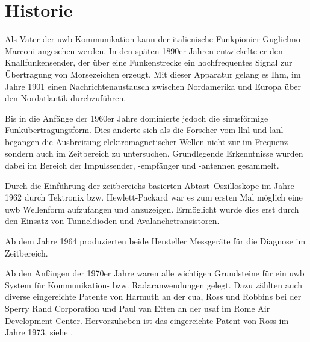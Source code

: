 \begin{comment}
------------------------------------------------------------------------------------------
\end{comment}
\section{Historie}

Als Vater der \gls{uwb} Kommunikation kann der italienische Funkpionier Guglielmo Marconi angesehen werden. In den späten 1890er Jahren entwickelte er den Knallfunkensender, der über eine Funkenstrecke ein hochfrequentes Signal zur Übertragung von Morsezeichen erzeugt. Mit dieser Apparatur gelang es Ihm, im Jahre 1901 einen Nachrichtenaustausch zwischen Nordamerika und Europa über den Nordatlantik durchzuführen.\cite{fontana2004recent}


Bis in die Anfänge der 1960er Jahre dominierte jedoch die sinusförmige Funkübertragungsform. Dies änderte sich als die Forscher vom \gls{llnl} und \gls{lanl} begangen die Ausbreitung elektromagnetischer Wellen nicht zur im Frequenz- sondern auch im Zeitbereich zu untersuchen. Grundlegende Erkenntnisse wurden dabei im Bereich der Impulssender, -empfänger und -antennen gesammelt.\cite{eltaher2004positioning, fontana2004recent, lakkundi2006ultra, aiello2006ultra}

Durch die Einführung der zeitbereichs basierten Abtast--Oszilloskope im Jahre 1962 durch Tektronix bzw. Hewlett-Packard war es zum ersten Mal möglich eine \gls{uwb} Wellenform aufzufangen und anzuzeigen. Ermöglicht wurde dies erst durch den Einsatz von Tunneldioden und Avalanchetransistoren. \cite{fontana2004recent, lakkundi2006ultra, aiello2006ultra}

Ab dem Jahre 1964 produzierten beide Hersteller Messgeräte für die Diagnose im Zeitbereich. \cite{barrett2001technical}

Ab den Anfängen der 1970er Jahre waren alle wichtigen Grundsteine für ein \gls{uwb} System für Kommunikation- bzw. Radaranwendungen gelegt. Dazu zählten auch diverse eingereichte Patente von Harmuth an der \gls{cua}, Ross und Robbins bei der Sperry Rand Corporation und Paul van Etten an der \gls{usaf} im Rome Air Development Center.\cite{barrett2001technical, fontana2004recent, yang2004uwbcom} Hervorzuheben ist das eingereichte Patent von Ross im Jahre 1973, siehe \cite{g1973transmission}.


